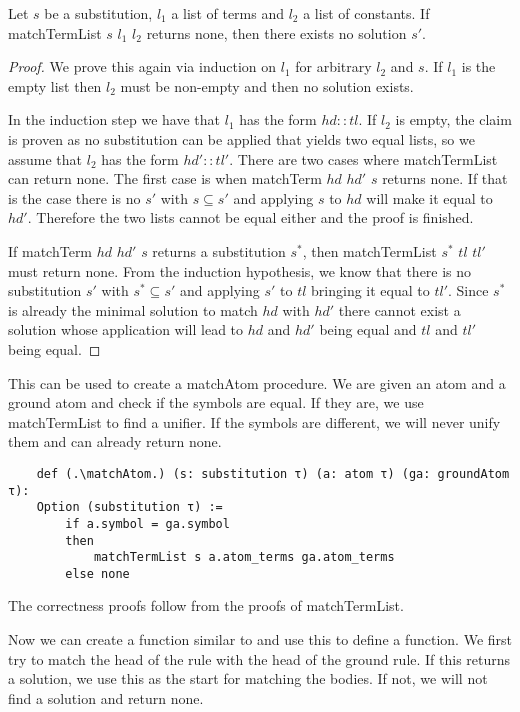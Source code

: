 \begin{lemma}[\matchTermListNoneImplNoSolution]
    Let $s$ be a substitution, $l_1$ a list of terms and $l_2$ a list of constants. If matchTermList $s$ $l_1$ $l_2$ returns none, then there exists no solution $s'$.
\end{lemma}
\begin{proof}
    We prove this again via induction on $l_1$ for arbitrary $l_2$ and $s$. If $l_1$ is the empty list then $l_2$ must be non-empty and then no solution exists.

    In the induction step we have that $l_1$ has the form $hd::tl$. If $l_2$ is empty, the claim is proven as no substitution can be applied that yields two equal lists, so we assume that $l_2$ has the form $hd'::tl'$. There are two cases where matchTermList can return none. The first case is when matchTerm $hd$ $hd'$ $s$ returns none. If that is the case there is no $s'$ with $s\subseteq s'$ and applying $s$ to $hd$ will make it equal to $hd'$. Therefore the two lists cannot be equal either and the proof is finished.

    If matchTerm $hd$ $hd'$ $s$ returns a substitution $s^\ast$, then matchTermList $s^\ast$ $tl$ $tl'$ must return none. From the induction hypothesis, we know that there is no substitution $s'$ with $s^\ast \subseteq s'$ and applying $s'$ to $tl$ bringing it equal to $tl'$. Since $s^\ast$ is already the minimal solution to match $hd$ with $hd'$ there cannot exist a solution whose application will lead to $hd$ and $hd'$ being equal and $tl$ and $tl'$ being equal.
\end{proof}

This can be used to create a matchAtom procedure. We are given an atom and a ground atom and check if the symbols are equal. If they are, we use matchTermList to find a unifier.
If the symbols are different, we will never unify them and can already return none.

\begin{lstlisting}
    def (.\matchAtom.) (s: substitution τ) (a: atom τ) (ga: groundAtom τ):
    Option (substitution τ) :=
        if a.symbol = ga.symbol
        then
            matchTermList s a.atom_terms ga.atom_terms
        else none
\end{lstlisting}

The correctness proofs follow from the proofs of matchTermList.

Now we can create a \matchAtomList function similar to \matchTermList and use this to define a \matchRule function. We first try to match the head of the rule with the head of the ground rule. If this returns a solution, we use this as the start for matching the bodies. If not, we will not find a solution and return none.

